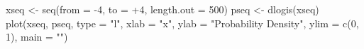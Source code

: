 \begin{Schunk}
\begin{Sinput}
 xseq <- seq(from = -4, to = +4, length.out = 500)
 pseq <- dlogis(xseq)
 plot(xseq, pseq, type = "l", xlab = "x", ylab = "Probability Density", ylim = c(0, 
      1), main = "")
\end{Sinput}
\end{Schunk}
